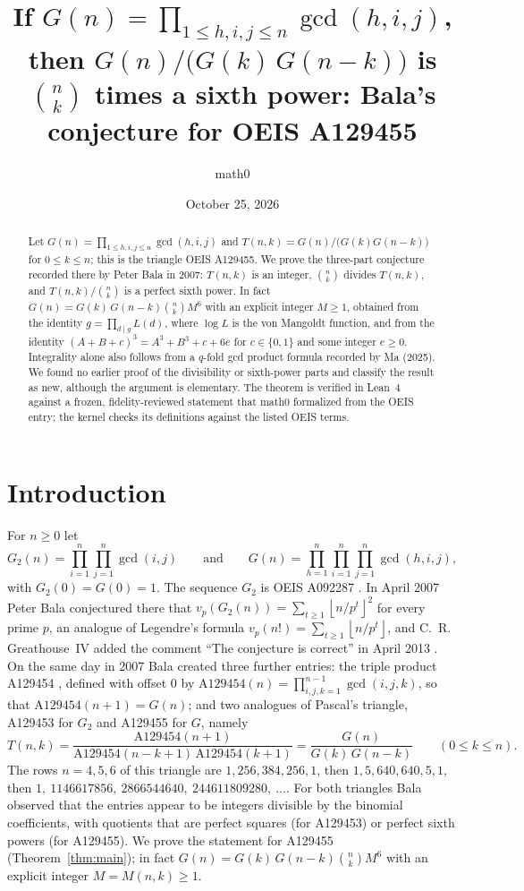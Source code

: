 \documentclass[11pt]{amsart}
\title[The triple-gcd analogue of Pascal's triangle]{If $G(n)=\prod_{1\le h,i,j\le n}\gcd(h,i,j)$, then $G(n)/\bigl(G(k)\,G(n-k)\bigr)$ is $\binom{n}{k}$ times a sixth power: Bala's conjecture for OEIS A129455}
\author{math0}
\date{October 25, 2026}
\theoremstyle{plain}
\theoremstyle{definition}
\newcommand{\fl}[1]{\left\lfloor #1\right\rfloor}
\begin{document}
\begin{abstract}
Let $G(n)=\prod_{1\le h,i,j\le n}\gcd(h,i,j)$ and $T(n,k)=G(n)/\bigl(G(k)G(n-k)\bigr)$ for $0\le k\le n$; this is the triangle OEIS A129455.
We prove the three-part conjecture recorded there by Peter Bala in 2007: $T(n,k)$ is an integer, $\binom nk$ divides $T(n,k)$, and $T(n,k)/\binom nk$ is a perfect sixth power. In fact $G(n)=G(k)\,G(n-k)\binom nk M^6$ with an explicit integer $M\ge1$, obtained from the identity $g=\prod_{d\mid g}L(d)$, where $\log L$ is the von Mangoldt function, and from the identity $(A+B+c)^3=A^3+B^3+c+6e$ for $c\in\{0,1\}$ and some integer $e\ge0$.
Integrality alone also follows from a $q$-fold gcd product formula recorded by Ma (2025). We found no earlier proof of the divisibility or sixth-power parts and classify the result as new, although the argument is elementary.
The theorem is verified in Lean~4 against a frozen, fidelity-reviewed statement that math0 formalized from the OEIS entry; the kernel checks its definitions against the listed OEIS terms.
\end{abstract}
\maketitle

\section{Introduction}

For $n\ge0$ let
\[
  G_2(n)=\prod_{i=1}^{n}\prod_{j=1}^{n}\gcd(i,j)\qquad\text{and}\qquad G(n)=\prod_{h=1}^{n}\prod_{i=1}^{n}\prod_{j=1}^{n}\gcd(h,i,j),
\]
with $G_2(0)=G(0)=1$. The sequence $G_2$ is OEIS A092287 \cite{A092287}. In April 2007 Peter Bala conjectured there that $v_p(G_2(n))=\sum_{t\ge1}\fl{n/p^t}^2$ for every prime $p$, an analogue of Legendre's formula $v_p(n!)=\sum_{t\ge1}\fl{n/p^t}$, and C.~R. Greathouse~IV added the comment ``The conjecture is correct'' in April 2013 \cite{A092287}.
On the same day in 2007 Bala created three further entries: the triple product A129454 \cite{A129454}, defined with offset $0$ by $\mathrm{A129454}(n)=\prod_{i,j,k=1}^{n-1}\gcd(i,j,k)$, so that $\mathrm{A129454}(n+1)=G(n)$; and two analogues of Pascal's triangle, A129453 \cite{A129453} for $G_2$ and A129455 \cite{A129455} for $G$, namely
\[
  T(n,k)=\frac{\mathrm{A129454}(n+1)}{\mathrm{A129454}(n-k+1)\,\mathrm{A129454}(k+1)}=\frac{G(n)}{G(k)\,G(n-k)}\qquad(0\le k\le n).
\]
The rows $n=4,5,6$ of this triangle are $1,256,384,256,1$, then $1,5,640,640,5,1$, then $1,\ 1146617856,\ 2866544640,\ 244611809280,\ \dots$.
For both triangles Bala observed that the entries appear to be integers divisible by the binomial coefficients, with quotients that are perfect squares (for A129453) or perfect sixth powers (for A129455).
We prove the statement for A129455 (Theorem~\ref{thm:main}); in fact $G(n)=G(k)\,G(n-k)\binom nk M^6$ with an explicit integer $M=M(n,k)\ge1$.
\end{document}
